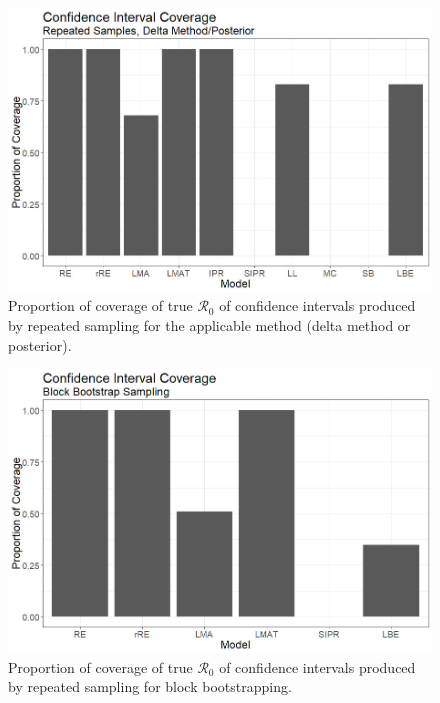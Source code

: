 \documentclass[12pt]{article}
\newcommand{\rr}{\ensuremath{\mathcal{R}_0}}
\begin{document}
\begin{figure}[H]
	\begin{center}
		\includegraphics[scale=0.5]{images/coverage2.jpg}
		\caption{Proportion of coverage of true $\rr$ of confidence intervals produced by repeated sampling for the applicable method (delta method or posterior).}
		\label{fig:coverage}	
	\end{center}
\end{figure}

\begin{figure}[H]
	\begin{center}
		\includegraphics[scale=0.5]{images/coverage.jpg}
		\caption{Proportion of coverage of true $\rr$ of confidence intervals produced by repeated sampling for block bootstrapping.}
		\label{fig:coverage}	
	\end{center}
\end{figure}
\end{document}

